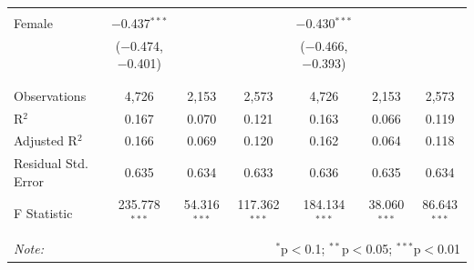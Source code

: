 \documentclass[12pt,a4paper]{article}
\numberwithin{equation}{section}
\begin{document}
\begin{landscape}
\begin{table}[!htbp]
\begin{tabular}{@{\extracolsep{5pt}}lcccccc}
			& & & & & & \\ 
			Female & $-$0.437$^{***}$ &  &  & $-$0.430$^{***}$ &  &  \\ 
			& ($-$0.474, $-$0.401) &  &  & ($-$0.466, $-$0.393) &  &  \\ 
			& & & & & & \\ 
			\hline \\[-1.8ex] 
			Observations & 4,726 & 2,153 & 2,573 & 4,726 & 2,153 & 2,573 \\ 
			R$^{2}$ & 0.167 & 0.070 & 0.121 & 0.163 & 0.066 & 0.119 \\ 
			Adjusted R$^{2}$ & 0.166 & 0.069 & 0.120 & 0.162 & 0.064 & 0.118 \\ 
			Residual Std. Error & 0.635 & 0.634 & 0.633 & 0.636 & 0.635 & 0.634 \\ 
			F Statistic & 235.778$^{***}$ & 54.316$^{***}$ & 117.362$^{***}$ & 184.134$^{***}$ & 38.060$^{***}$ & 86.643$^{***}$ \\ 
			\hline 
			\hline \\[-1.8ex] 
			\textit{Note:}  & \multicolumn{6}{r}{$^{*}$p$<$0.1; $^{**}$p$<$0.05; $^{***}$p$<$0.01} \\ 
		\end{tabular} 
	\end{table} 
	
\end{landscape}

\newpage
\end{document}
